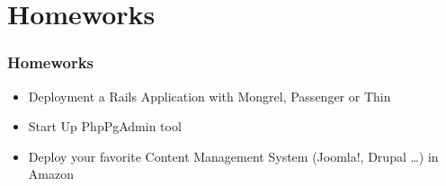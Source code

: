 \documentclass{beamer}
\begin{document}
\section{Homeworks}
\begin{frame}
  \frametitle{Homeworks}
  \begin{itemize}
    \item Deployment a Rails Application with Mongrel, Passenger or Thin
    \item Start Up PhpPgAdmin tool
    \item Deploy your favorite Content Management System (Joomla!, Drupal \dots) in Amazon
  \end{itemize}
\end{frame}
\end{document}
